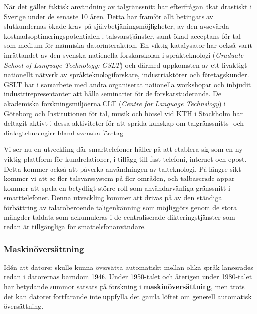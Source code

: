 \begin{multicols}{2}
När det gäller faktisk användning av talgränssnitt har efterfrågan
ökat drastiskt i Sverige under de senaste 10 åren. Detta har framför
allt betingats av slutkundernas ökade krav på
själv\-be\-tjän\-ings\-möj\-lig\-het\-er, av den avsevärda
kost\-nads\-opti\-mer\-ings\-poten\-tial\-en i talsvarstjänster, samt
ökad acceptans för tal som medium för människa-datorinteraktion. En
viktig katalysator har också varit inrättandet av den svenska
nationella forskarskolan i språkteknologi (\emph{Graduate School of
  Language Technology: GSLT}) och därmed uppkomsten av ett livaktigt
nationellt nätverk av språkteknologiforskare, industriaktörer och
företagskunder. GSLT har i samarbete med andra organiserat nationella
work\-shop\-ar och inbjudit industrirepresentanter att hålla seminarier
för de forskarstuderande. De akademiska forskningsmiljöerna CLT
(\emph{Centre for Language Technology}) i Göteborg och Institutionen
för tal, musik och hörsel vid KTH i Stockholm har deltagit aktivt i
dessa aktiviteter för att sprida kunskap om talgränssnitts- och
dialogteknologier bland svenska företag.

Vi ser nu en utveckling där smarttelefoner håller på att etablera sig
som en ny viktig plattform för kundrelationer, i tillägg till fast
telefoni, internet och epost. Detta kommer också att påverka
användningen av talteknologi. På längre sikt kommer vi att se fler
talsvarssystem på fler områden, och talbaserade appar kommer att spela
en betydligt större roll som användarvänliga gränssnitt i
smarttelefoner. Denna utveckling kommer att drivas på av den ständiga
förbättring av talaroberoende taligenkänning som möjliggörs genom de
stora mängder taldata som ackumuleras i de centraliserade
dikteringstjänster som redan är tillgängliga för smattelefonanvändare.


\subsubsection{Maskin\-över\-sätt\-ning}

Idén att datorer skulle kunna översätta automatiskt mellan olika språk
lanserades redan i datorernas barndom 1946. Under 1950-talet och
återigen under 1980-talet har betydande summor satsats på forskning i
\textbf{maskin\-över\-sätt\-ning}, men trots det kan datorer fortfarande
inte uppfylla det gamla löftet om generell automatisk översättning.



\end{multicols}
